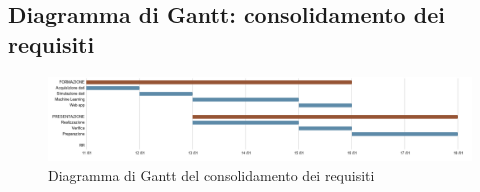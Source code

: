 \subsection{Diagramma di Gantt: consolidamento dei requisiti}\label{PianificazioneDiagrammaDiGanttConsolidamento}
\begin{figure}[!h]
	\begin{center}
		\includegraphics[width=1\linewidth]{../immagini/pdp/gantt_consolidamento_requisiti.png}
		\caption{Diagramma di Gantt del consolidamento dei requisiti}
	\end{center}
\end{figure}
\clearpage
